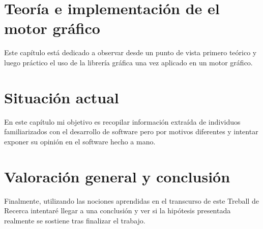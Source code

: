 \documentclass{report}
\begin{document}
  
\newpage
\chapter{Teoría e implementación de el motor gráfico}
Este capítulo está dedicado a observar desde un punto de vista primero teórico y luego práctico el uso de la librería gráfica una vez aplicado en un motor gráfico.
\newpage
\chapter{Situación actual}
En este capítulo mi objetivo es recopilar información extraída de individuos familiarizados con el desarrollo de software pero por motivos diferentes y intentar exponer su opinión en el software hecho a mano.
\newpage
\chapter{Valoración general y conclusión}
Finalmente, utilizando las nociones aprendidas en el transcurso de este Treball de Recerca intentaré llegar a una conclusión y ver si la hipótesis presentada realmente se sostiene tras finalizar el trabajo.
\end{document}
